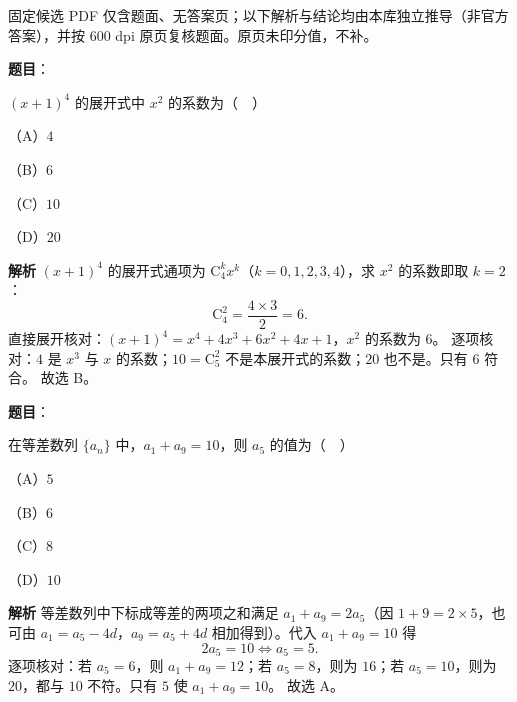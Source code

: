 \begin{gktip}
固定候选 PDF 仅含题面、无答案页；以下解析与结论均由本库独立推导（非官方答案），并按 600 dpi 原页复核题面。原页未印分值，不补。
\end{gktip}

\begin{answer}

\textbf{题目}：

$(x+1)^4$ 的展开式中 $x^2$ 的系数为（　）

（A）$4$

（B）$6$

（C）$10$

（D）$20$

\textbf{解析}
$(x+1)^4$ 的展开式通项为 $\mathrm C_4^k x^k$（$k=0,1,2,3,4$），求 $x^2$ 的系数即取 $k=2$：
\nopagebreak[4]
\[\mathrm C_4^2=\frac{4\times3}{2}=6.\]
直接展开核对：$(x+1)^4=x^4+4x^3+6x^2+4x+1$，$x^2$ 的系数为 $6$。
逐项核对：$4$ 是 $x^3$ 与 $x$ 的系数；$10=\mathrm C_5^2$ 不是本展开式的系数；$20$ 也不是。只有 $6$ 符合。
故选 B。


\end{answer}
\begin{answer}

\textbf{题目}：

在等差数列 $\{a_n\}$ 中，$a_1+a_9=10$，则 $a_5$ 的值为（　）

（A）$5$

（B）$6$

（C）$8$

（D）$10$

\textbf{解析}
等差数列中下标成等差的两项之和满足 $a_1+a_9=2a_5$（因 $1+9=2\times5$，也可由 $a_1=a_5-4d$，$a_9=a_5+4d$ 相加得到）。代入 $a_1+a_9=10$ 得
\nopagebreak[4]
\[2a_5=10\iff a_5=5.\]
逐项核对：若 $a_5=6$，则 $a_1+a_9=12$；若 $a_5=8$，则为 $16$；若 $a_5=10$，则为 $20$，都与 $10$ 不符。只有 $5$ 使 $a_1+a_9=10$。
故选 A。


\end{answer}
